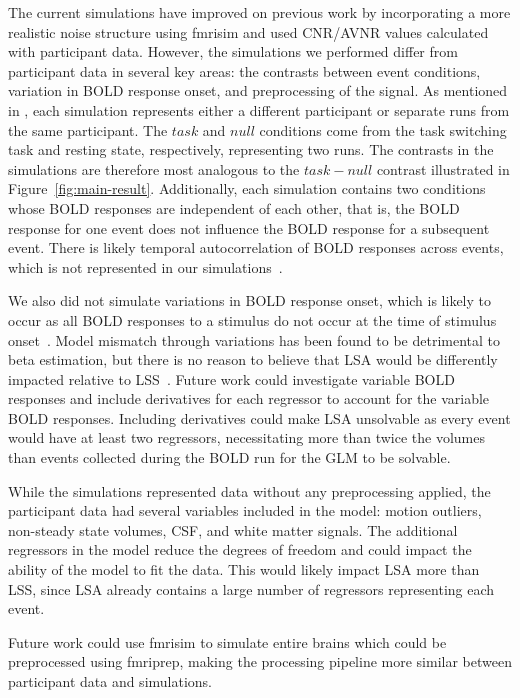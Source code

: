 \documentclass[phd,appendix,figures]{uithesis}
\begin{document}
The current simulations have improved on previous work by incorporating a more
realistic noise structure using fmrisim and used CNR/AVNR values calculated with participant data.
However, the simulations we performed differ from participant data in several key areas:
the contrasts between event conditions,
variation in BOLD response onset, and preprocessing of the signal.
As mentioned in , each simulation represents
either a different participant or separate runs from the same participant.
The $task$ and $null$ conditions come from the task switching task and resting state,
respectively, representing two runs.
The contrasts in the simulations are therefore most analogous to the $task - null$
contrast illustrated in Figure~\ref{fig:main-result}.
Additionally, each simulation contains two conditions whose BOLD responses
are independent of each other, that is, the BOLD response for one event
does not influence the BOLD response for a subsequent event.
There is likely temporal autocorrelation of BOLD responses across events,
which is not represented in our simulations~\cite{Abdulrahman2016}.

We also did not simulate variations in BOLD response onset, which is likely to occur
as all BOLD responses to a stimulus do not occur at the time of stimulus onset~\cite{DEsposito2003}.
Model mismatch through variations has been found to be detrimental to beta estimation, 
but there is no reason to believe that LSA would be differently impacted relative to LSS~\cite{Turner2012a}.
Future work could investigate variable BOLD responses and include derivatives for each regressor to account for
the variable BOLD responses.
Including derivatives could make LSA unsolvable as every event would have at least two regressors, necessitating
more than twice the volumes than events collected during the BOLD run
for the GLM to be solvable.

While the simulations represented data without any preprocessing applied,
the participant data had several variables included in the model: motion outliers, non-steady state volumes,
CSF, and white matter signals.
The additional regressors in the model reduce the degrees of freedom
and could impact the ability of the model to fit the data.
This would likely impact LSA more than LSS, since LSA already contains
a large number of regressors representing each event.

Future work could use fmrisim to simulate entire brains which could be preprocessed using fmriprep,
making the processing pipeline more similar between participant data and simulations.
\end{document}
